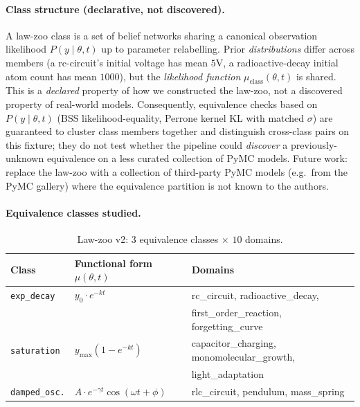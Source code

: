 \documentclass{article}
\begin{document}
\paragraph{Class structure (declarative, not discovered).}
\label{sec:lawzoo-honest}
A law-zoo class is a set of belief networks sharing a canonical
observation likelihood $P(y \mid \theta, t)$ up to parameter
relabelling. Prior \emph{distributions} differ across members (a
rc-circuit's initial voltage has mean $5$V, a radioactive-decay initial
atom count has mean $1000$), but the \emph{likelihood function}
$\mu_{\text{class}}(\theta, t)$ is shared. This is a \emph{declared}
property of how we constructed the law-zoo, not a discovered
property of real-world models. Consequently, equivalence checks
based on $P(y \mid \theta, t)$ (BSS likelihood-equality,
Perrone kernel KL with matched $\sigma$) are guaranteed to cluster
class members together and distinguish cross-class pairs on this
fixture; they do not test whether the pipeline could \emph{discover}
a previously-unknown equivalence on a less curated collection of
PyMC models. Future work: replace the law-zoo with a collection of
third-party PyMC models (e.g.\ from the PyMC gallery) where the
equivalence partition is not known to the authors.

\paragraph{Equivalence classes studied.}
\begin{table}[h]
\centering
\small
\caption{Law-zoo v2: $3$ equivalence classes $\times$ $10$ domains.}
\label{tab:lawzoo}
\begin{tabular}{lll}
\toprule
Class & Functional form $\mu(\theta, t)$ & Domains \\
\midrule
\texttt{exp\_decay}    & $y_{0}\cdot e^{-k t}$       & rc\_circuit, radioactive\_decay, \\
                        &                               & first\_order\_reaction, forgetting\_curve \\[2pt]
\texttt{saturation}    & $y_{\max}(1 - e^{-k t})$     & capacitor\_charging, monomolecular\_growth, \\
                        &                               & light\_adaptation \\[2pt]
\texttt{damped\_osc.}   & $A \cdot e^{-\gamma t}\cos(\omega t + \phi)$
                                                      & rlc\_circuit, pendulum, mass\_spring \\
\bottomrule
\end{tabular}
\end{table}
\end{document}
